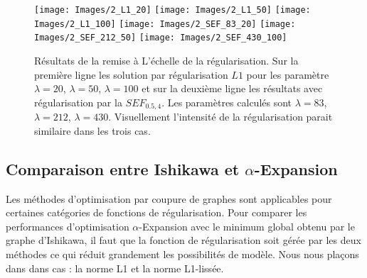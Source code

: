 \documentclass[../main/These_Mathias_Paget.tex]{subfiles}
\begin{document}

\begin{figure}
\centering
\texttt{[image: Images/2\_L1\_20]}
\texttt{[image: Images/2\_L1\_50]}
\texttt{[image: Images/2\_L1\_100]}
\hspace{10 pt}
\texttt{[image: Images/2\_SEF\_83\_20]}
\texttt{[image: Images/2\_SEF\_212\_50]}
\texttt{[image: Images/2\_SEF\_430\_100]}
\caption{Résultats de la remise à L’échelle de la régularisation. Sur la première ligne les solution par régularisation $L1$ pour les paramètre $\lambda=20$, $\lambda=50$, $\lambda=100$ et sur la deuxième ligne les résultats avec régularisation par la $SEF_{0.5,4}$. Les paramètres calculés sont $\lambda=83$, $\lambda=212$, $\lambda=430$. Visuellement l'intensité de la régularisation parait similaire dans les trois cas.}
\label{fig:L1_SEF}
\end{figure}


\subsection{Comparaison entre Ishikawa et $\alpha$-Expansion}

Les méthodes d'optimisation par coupure de graphes sont applicables pour certaines catégories de fonctions de régularisation. Pour comparer les performances d'optimisation $\alpha$-Expansion avec le minimum global obtenu par le graphe d'Ishikawa, il faut que la fonction de régularisation soit gérée par les deux méthodes ce qui réduit grandement les possibilités de modèle. Nous nous plaçons dans dans cas : la norme L1 et la norme L1-lissée.
\end{document}
